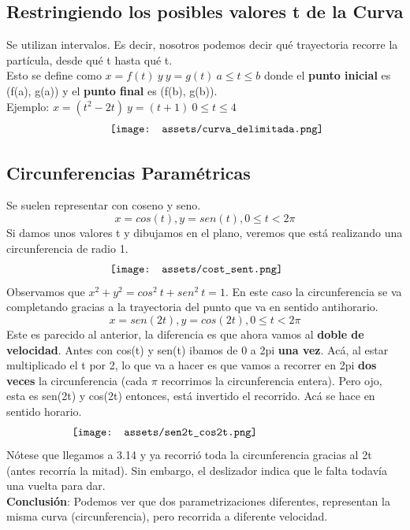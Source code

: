 \documentclass[10pt,a4paper]{article}
\begin{document}
\subsection*{Restringiendo los posibles valores t de la Curva}
Se utilizan intervalos. Es decir, nosotros podemos decir qué trayectoria recorre la partícula, desde qué t hasta qué t. \\
Esto se define como $ x = f(t) \ y \ y = g(t) \ a \le t \le b$ donde el \textbf{punto inicial} es (f(a), g(a)) y el \textbf{punto final} es (f(b), g(b)). \\
Ejemplo: $ x = (t^{2} - 2t) \ y = (t+1) \ 0 \le t \le 4$
\[\begin{minipage}[b]{0.5\textwidth}
    \texttt{[image: assets/curva\_delimitada.png]}
\end{minipage}\]
\subsection*{Circunferencias Paramétricas}
Se suelen representar con coseno y seno.
\[x = cos(t), y = sen(t), 0\le t < 2\pi\]
Si damos unos valores t y dibujamos en el plano, veremos que está realizando una circunferencia de radio 1.
\[\begin{minipage}[b]{0.5\textwidth}
    \texttt{[image: assets/cost\_sent.png]}
\end{minipage}\]
Observamos que $x^{2} + y^{2} = cos^{2}\ t + sen^{2}\ t = 1$. En este caso la circunferencia se va completando gracias a la trayectoria del punto que va en sentido antihorario. \\
\[x = sen(2t), y = cos(2t), 0\le t < 2\pi\]
Este es parecido al anterior, la diferencia es que ahora vamos al \textbf{doble de velocidad}. Antes con cos(t) y sen(t) ibamos de 0 a 2pi \textbf{una vez}. Acá, al estar multiplicado el t por 2, lo que va a hacer es que vamos a recorrer en 2pi \textbf{dos veces} la circunferencia (cada $\pi$ recorrimos la circunferencia entera). Pero ojo, esta es sen(2t) y cos(2t) entonces, está invertido el recorrido. Acá se hace en sentido horario.
\[\begin{minipage}[b]{0.7\textwidth}
    \texttt{[image: assets/sen2t\_cos2t.png]}
\end{minipage}\]
Nótese que llegamos a 3.14 y ya recorrió toda la circunferencia gracias al 2t (antes recorría la mitad). Sin embargo, el deslizador indica que le falta todavía una vuelta para dar. \\
\textbf{Conclusión}: Podemos ver que dos parametrizaciones diferentes, representan la misma curva (circunferencia), pero recorrida a diferente velocidad.
\end{document}
